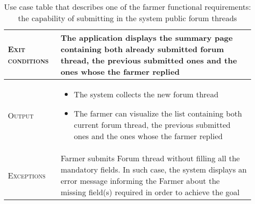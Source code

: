 \begin{table}[H]
\begin{tabular}{|l|p{}|}
        \hline %
        \textsc{Exit conditions}    &  The application displays the summary page containing both already submitted forum thread, the previous submitted ones and the ones whose the farmer replied\\
    	\hline %
    	\textsc{Output}             &  \begin{itemize}
    	    \item The system collects the new forum thread
    	    \item The farmer can visualize the list containing both current forum thread, the previous submitted ones and the ones whose the farmer replied
    	\end{itemize}\\
    	\hline %
    	\textsc{Exceptions}         &   Farmer submits Forum thread without filling all the mandatory fields. In such case, the system displays an error message informing the Farmer about the missing field(s) required in order to achieve the goal\\
    	\hline %
        
    \end{tabular}

\caption{\label{tab:Forum_generation}Use case table that describes one of the farmer functional requirements: the capability of submitting in the system public forum threads}
\end{table}